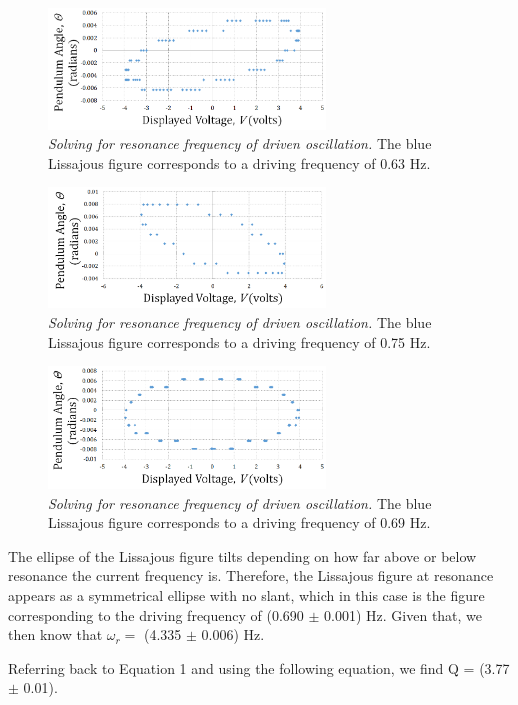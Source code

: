 \documentclass[twoside,twocolumn]{article}
\begin{document}
\begin{figure}[!htbp]
    \centering
    \includegraphics[width=2.9in]{FreqBelow.png}
    \caption{\textit{Solving for resonance frequency of driven oscillation.} The blue Lissajous figure corresponds to a driving frequency of 0.63 Hz.}
\end{figure}

\begin{figure}[!htbp]
    \centering
    \includegraphics[width=2.9in]{FreqAbove.png}
    \caption{\textit{Solving for resonance frequency of driven oscillation.} The blue Lissajous figure corresponds to a driving frequency of 0.75 Hz.}
\end{figure}

\begin{figure}[!htbp]
    \centering
    \includegraphics[width=2.9in]{FreqOn.png}
    \caption{\textit{Solving for resonance frequency of driven oscillation.} The blue Lissajous figure corresponds to a driving frequency of 0.69 Hz.}
\end{figure}

\noindent The ellipse of the Lissajous figure tilts depending on how far above or below resonance the current frequency is. Therefore, the Lissajous figure at resonance appears as a symmetrical ellipse with no slant, which in this case is the figure corresponding to the driving frequency of (0.690 $\pm$ 0.001) Hz. Given that, we then know that $\omega_r =$ (4.335 $\pm$ 0.006) Hz.

\noindent Referring back to Equation 1 and using the following equation, we find Q = (3.77 $\pm$ 0.01).
\end{document}
